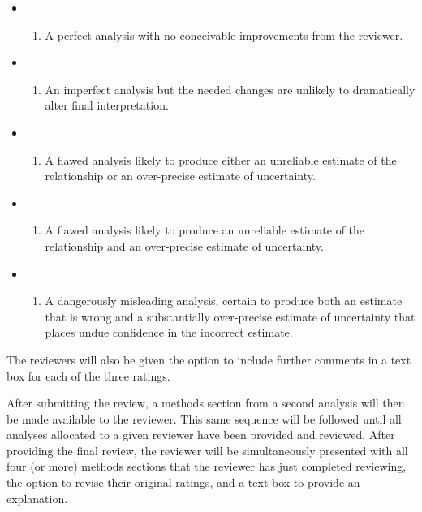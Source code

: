 \documentclass[Review,times,sageh]{sagej}
\providecommand{\tightlist}{\setlength{\itemsep}{0pt}\setlength{\parskip}{0pt}}
\begin{document}
\begin{itemize}
\item
  \begin{enumerate}
  \def\labelenumi{\arabic{enumi}.}
  \setcounter{enumi}{99}
  \tightlist
  \item
    A perfect analysis with no conceivable improvements from the
    reviewer.
  \end{enumerate}
\item
  \begin{enumerate}
  \def\labelenumi{\arabic{enumi}.}
  \setcounter{enumi}{74}
  \tightlist
  \item
    An imperfect analysis but the needed changes are unlikely to
    dramatically alter final interpretation.
  \end{enumerate}
\item
  \begin{enumerate}
  \def\labelenumi{\arabic{enumi}.}
  \setcounter{enumi}{49}
  \tightlist
  \item
    A flawed analysis likely to produce either an unreliable estimate of
    the relationship or an over-precise estimate of uncertainty.
  \end{enumerate}
\item
  \begin{enumerate}
  \def\labelenumi{\arabic{enumi}.}
  \setcounter{enumi}{24}
  \tightlist
  \item
    A flawed analysis likely to produce an unreliable estimate of the
    relationship and an over-precise estimate of uncertainty.
  \end{enumerate}
\item
  \begin{enumerate}
  \def\labelenumi{\arabic{enumi}.}
  \setcounter{enumi}{-1}
  \tightlist
  \item
    A dangerously misleading analysis, certain to produce both an
    estimate that is wrong and a substantially over-precise estimate of
    uncertainty that places undue confidence in the incorrect estimate.
  \end{enumerate}
\end{itemize}

The reviewers will also be given the option to include further comments
in a text box for each of the three ratings.

After submitting the review, a methods section from a second analysis
will then be made available to the reviewer. This same sequence will be
followed until all analyses allocated to a given reviewer have been
provided and reviewed. After providing the final review, the reviewer
will be simultaneously presented with all four (or more) methods
sections that the reviewer has just completed reviewing, the option to
revise their original ratings, and a text box to provide an explanation.
\end{document}
